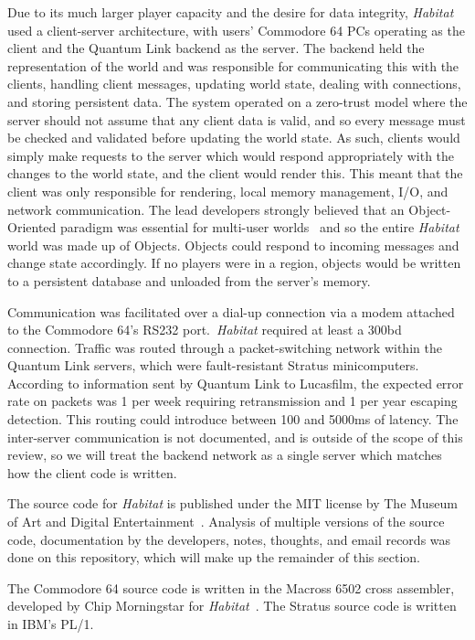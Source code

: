 Due to its much larger player capacity and the desire for data integrity, \textit{Habitat} used a client-server architecture, with users' Commodore 64 PCs operating as the client and the Quantum Link backend as the server. The backend held the representation of the world and was responsible for communicating this with the clients, handling client messages, updating world state, dealing with connections, and storing persistent data. The system operated on a zero-trust model where the server should not assume that any client data is valid, and so every message must be checked and validated before updating the world state. As such, clients would simply make requests to the server which would respond appropriately with the changes to the world state, and the client would render this. This meant that the client was only responsible for rendering, local memory management, I/O, and network communication.
The lead developers strongly believed that an Object-Oriented paradigm was essential for multi-user worlds~\cite{morningstar} and so the entire \textit{Habitat} world was made up of Objects. Objects could respond to incoming messages and change state accordingly. If no players were in a region, objects would be written to a persistent database and unloaded from the server's memory.

Communication was facilitated over a dial-up connection via a modem attached to the Commodore 64's RS232 port.\ \textit{Habitat} required at least a 300bd connection. Traffic was routed through a packet-switching network within the Quantum Link servers, which were fault-resistant Stratus minicomputers. According to information sent by Quantum Link to Lucasfilm, the expected error rate on packets was 1 per week requiring retransmission and 1 per year escaping detection\cite{habitatsrc}. This routing could introduce between 100 and 5000ms of latency. The inter-server communication is not documented, and is outside of the scope of this review, so we will treat the backend network as a single server which matches how the client code is written.

The source code for \textit{Habitat} is published under the MIT license by The Museum of Art and Digital Entertainment~\cite{habitatsrc}. Analysis of multiple versions of the source code, documentation by the developers, notes, thoughts, and email records was done on this repository, which will make up the remainder of this section.

The Commodore 64 source code is written in the Macross 6502 cross assembler, developed by Chip Morningstar for \textit{Habitat}~\cite{macrosssrc}. The Stratus source code is written in IBM's PL/1.

